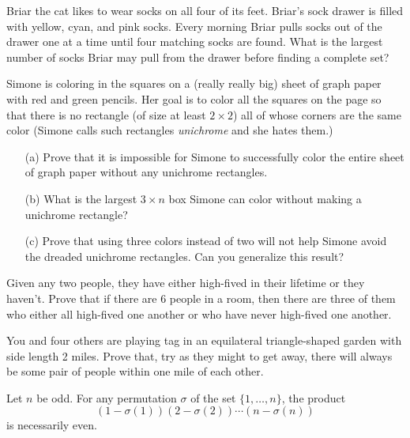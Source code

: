 \documentclass{article}
\begin{document}
\begin{exercise}
    Briar the cat likes to wear socks on all four of its feet. 
    Briar's sock drawer is filled with yellow, cyan, and pink socks. 
    Every morning Briar pulls socks out of the drawer one at a time until four matching socks are found. 
    What is the largest number of socks Briar may pull from the drawer before finding a complete set?
\end{exercise}

\begin{exercise}
    Simone is coloring in the squares on a (really really big) sheet of graph paper with red and green pencils. 
    Her goal is to color all the squares on the page so that there is no rectangle (of size at least \(2\times 2\)) all of whose corners are the same color (Simone calls such rectangles \textit{unichrome} and she hates them.) 
    \begin{enumerate}
        \item[(a)] Prove that it is impossible for Simone to successfully color the entire sheet of graph paper without any unichrome rectangles.
        \item[(b)] What is the largest \(3\times n\) box Simone can color without making a unichrome rectangle?
        \item[(c)] Prove that using three colors instead of two will not help Simone avoid the dreaded unichrome rectangles.
        Can you generalize this result?
    \end{enumerate}
\end{exercise}

\begin{exercise}
    Given any two people, they have either high-fived in their lifetime or they haven't.
    Prove that if there are 6 people in a room, then there are three of them who either all high-fived one another or who have never high-fived one another.
\end{exercise}

\begin{exercise}
    You and four others are playing tag in an equilateral triangle-shaped garden with side length 2 miles.
    Prove that, try as they might to get away, there will always be some pair of people within one mile of each other.
\end{exercise}

\begin{exercise}
    Let \(n\) be odd.
    For any permutation \(\sigma\) of the set \(\{1,\ldots,n\}\), the product
    \[(1-\sigma(1))(2-\sigma(2))\cdots(n-\sigma(n))\]
    is necessarily even.
\end{exercise}
\end{document}
